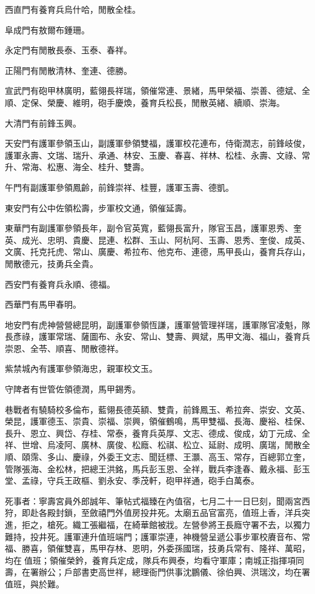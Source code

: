 \begin{pinyinscope}
西直門有養育兵烏什哈，閒散全桂。

阜成門有敖爾布鍾珊。

永定門有閒散長泰、玉泰、春祥。

正陽門有閒散清林、奎連、德勝。

宣武門有砲甲林廣明，藍翎長祥瑞，領催常連、景緒，馬甲榮福、崇善、德斌、全順、定保、榮慶、維明，砲手慶煥，養育兵松長，閒散英緒、續順、崇海。

大清門有前鋒玉興。

天安門有護軍參領玉山，副護軍參領雙福，護軍校花連布，侍衛潤志，前鋒岐俊，護軍永壽、文瑞、瑞升、承通、林安、玉慶、春喜、祥林、松桂、永壽、文祿、常升、常海、松惠、海全、桂升、雙壽。

午門有副護軍參領鳳齡，前鋒崇祥、桂豐，護軍玉壽、德凱。

東安門有公中佐領松壽，步軍校文通，領催延壽。

東華門有副護軍參領長年，副令官英寬，藍翎長富升，隊官玉昌，護軍恩秀、奎英、成光、忠明、貴慶、昆連、松群、玉山、阿杭阿、玉壽、恩秀、奎俊、成英、文廣、托克托虎、常山、廣慶、希拉布、他克布、連德，馬甲長山，養育兵存山，閒散德元，技勇兵全貴。

西安門有養育兵永順、德福。

西華門有馬甲春明。

地安門有虎神營營總昆明，副護軍參領恆謙，護軍營管理祥瑞，護軍隊官凌魁，隊長彥祿，護軍常瑞、薩圖布、永安、常山、雙壽、興斌，馬甲文海、福山，養育兵崇恩、全苓、順喜、閒散德祥。

紫禁城內有護軍參領海忠，親軍校文玉。

守陴者有世管佐領德潤，馬甲錫秀。

巷戰者有驍騎校多倫布，藍翎長德英額、雙貴，前鋒鳳玉、希拉奔、崇安、文英、榮昆，護軍德玉、崇貴、崇福、崇興，領催鶴鳴，馬甲雙福、長海、慶裕、桂保、長升、恩立、興岱、存桂、常泰，養育兵英厚、文志、德成、俊成，幼丁元成、全祥、世增、烏凌阿、廣林、廣俊、松廕、松祺、松立、延尉、成明、廣瑞，閒散全順、頤霈、多山、慶祿，外委王文志、聞廷標、王灝、高玉、常存，百總郭立奎，管隊張海、金松林，把總王洪銘，馬兵彭玉恩、全祥，戰兵李逢春、戴永福、彭玉堂、孟祿，守兵王政樞、劉永安、季茂軒，砲甲祥通，砲手白萬泰。

死事者：寧壽宮員外郎誠年、筆帖式福臻在內值宿，七月二十一日巳刻，聞兩宮西狩，即赴各殿封鎖，至斂禧門外值房投井死。太廟五品官富亮，值班上香，洋兵突進，拒之，槍死。織工張繼福，在綺華館被戕。左營參將王長廕守署不去，以獨力難持，投井死。護軍連升值班端門；護軍崇連，神機營呈遞公事步軍校賡音布、常福、勝喜，領催雙喜，馬甲存林、恩明，外委孫國瑞，技勇兵常有、隆祥、萬昭，均在值班；領催榮鈐，養育兵定成，隊兵布興泰，均看守軍庫；南城正指揮項同壽，在署辦公；戶部書吏高世祥，總理衙門供事沈鵬儀、徐伯興、洪瑞汶，均在署值班，與於難。


\end{pinyinscope}

